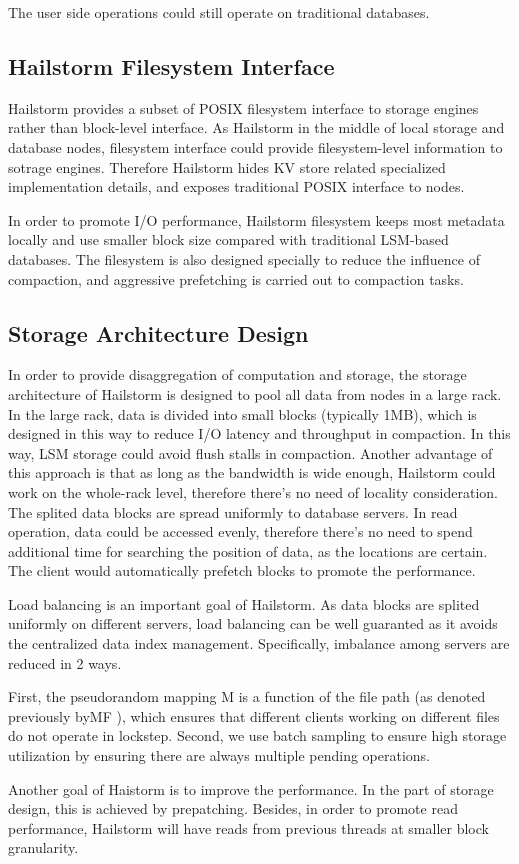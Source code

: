 \documentclass[a4paper,10pt,twoside]{article}
\begin{document}
The user side operations could still operate on traditional databases. 

\subsection{Hailstorm Filesystem Interface}
\par
Hailstorm provides a subset of POSIX filesystem interface to storage engines rather than block-level interface.
As Hailstorm in the middle of local storage and database nodes, filesystem interface could provide filesystem-level information to sotrage engines.
Therefore Hailstorm hides KV store related specialized implementation details, and exposes traditional POSIX interface to nodes.
\par
In order to promote I/O performance, Hailstorm filesystem keeps most metadata locally and use smaller block size compared with traditional LSM-based databases.
The filesystem is also designed specially to reduce the influence of compaction, and aggressive prefetching is carried out to compaction tasks.

\subsection{Storage Architecture Design}
\par
In order to provide disaggregation of computation and storage, the storage architecture of Hailstorm is designed to pool all data from nodes in a large rack.
In the large rack, data is divided into small blocks (typically 1MB), which is designed in this way to reduce I/O latency and throughput in compaction.
In this way, LSM storage could avoid flush stalls in compaction. 
Another advantage of this approach is that as long as the bandwidth is wide enough, Hailstorm could work on the whole-rack level, 
therefore there's no need of locality consideration.
The splited data blocks are spread uniformly to database servers. 
In read operation, data could be accessed evenly, therefore there's no need to spend additional time for searching the position of data, as the locations are certain.
The client would automatically prefetch blocks to promote the performance.
\par
Load balancing is an important goal of Hailstorm. 
As data blocks are splited uniformly on different servers, load balancing can be well guaranted as it avoids the centralized data index management.
Specifically, imbalance among servers are reduced in 2 ways.
\begin{displayquote}
	First, the pseudorandom
	mapping M is a function of the file path (as denoted
	previously byMF ), which ensures that different clients working
	on different files do not operate in lockstep. Second, we
	use batch sampling to ensure high storage utilization by ensuring
	there are always multiple pending operations.
\end{displayquote}
Another goal of Haistorm is to improve the performance.
In the part of storage design, this is achieved by prepatching. 
Besides, in order to promote read performance, Hailstorm will have reads from previous threads at smaller block granularity.
\end{document}
